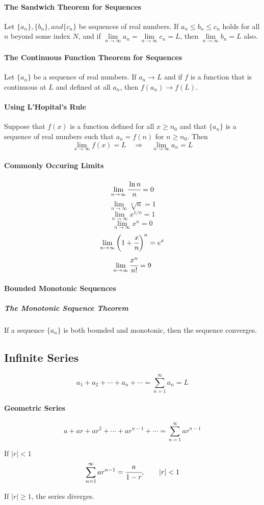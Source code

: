 \documentclass{article}
\begin{document}
            \paragraph{The Sandwich Theorem for Sequences} Let $\{a_n\},\{b_n\}, and \{c_n\}$ be sequences of real numbers. If $a_n\le b_n\le c_n$ holds for all $n$ beyond some index $N$, and if $\lim\limits_{n\to\infty}a_n=\lim\limits_{n\to\infty}c_n=L$, then $\lim\limits_{n\to\infty}b_n=L$ also.
            \paragraph{The Continuous Function Theorem for Sequences} Let $\{a_n\}$ be a sequence of real numbers. If $a_n\to L$ and if $f$ is a function that is continuous at $L$ and defined at all $a_n$, then $f(a_n)\to f(L)$.
            \paragraph{Using L'Hopital's Rule} Suppose that $f(x)$ is a function defined for all $x\ge n_0$ and that $\{a_n\}$ is a sequence of real numbers such that $a_n=f(n)$ for $n\ge n_0$. Then
            \[\lim\limits_{x\to\infty}f(x)=L\quad \Rightarrow \quad \lim\limits_{n\to\infty}a_n=L\]
            \paragraph{Commonly Occuring Limits}
            \[\lim\limits_{n\to\infty}\cfrac{\ln n}{n}=0\]
            \[\lim\limits_{n\to\infty}\sqrt[n]{n}=1\]
            \[\lim\limits_{n\to\infty}x^{1/n}=1\]
            \[\lim\limits_{n\to\infty}x^n=0\]
            \[\lim\limits_{n\to\infty}\bigg(1+\cfrac{x}{n}\bigg)^n=e^x\]
            \[\lim\limits_{n\to\infty}\cfrac{x^n}{n!}=9\]
            \paragraph{Bounded Monotonic Sequences}
                \subparagraph{The Monotonic Sequence Theorem} If a sequence $\{a_n\}$ is both bounded and monotonic, then the sequence converges.
        \subsection{Infinite Series}
            \[a_1+a_2+\cdots+a_n+\cdots=\sum_{n=1}^\infty a_n=L\]
            \paragraph{Geometric Series}
                \[a+ar+ar^2+\cdots+ar^{n-1}+\cdots=\sum_{n=1}^\infty ar^{n-1}\]
                \par If $|r|<1$
                \[\sum_{n=1}^\infty ar^{n-1}=\cfrac{a}{1-r},\qquad|r|<1\]
                \par If $|r|\ge 1$, the series diverges.
\end{document}
